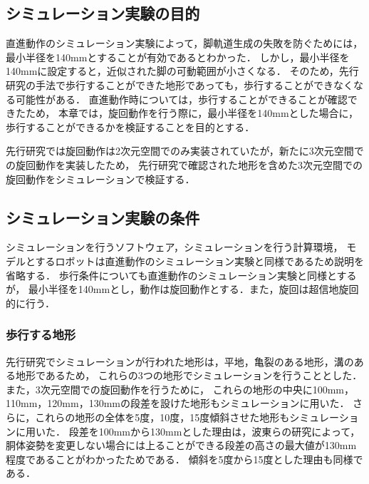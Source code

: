 
\subsection{シミュレーション実験の目的}
直進動作のシミュレーション実験によって，脚軌道生成の失敗を防ぐためには，最小半径を140mmとすることが有効であるとわかった．
しかし，最小半径を140mmに設定すると，近似された脚の可動範囲が小さくなる．
そのため，先行研究の手法で歩行することができた地形であっても，歩行することができなくなる可能性がある．
直進動作時については，歩行することができることが確認できたため，
本章では，旋回動作を行う際に，最小半径を140mmとした場合に，歩行することができるかを検証することを目的とする．

先行研究では旋回動作は2次元空間でのみ実装されていたが，新たに3次元空間での旋回動作を実装したため，
先行研究で確認された地形を含めた3次元空間での旋回動作をシミュレーションで検証する．

\subsection{シミュレーション実験の条件}
シミュレーションを行うソフトウェア，シミュレーションを行う計算環境，
モデルとするロボットは直進動作のシミュレーション実験と同様であるため説明を省略する．
歩行条件についても直進動作のシミュレーション実験と同様とするが，
最小半径を140mmとし，動作は旋回動作とする．また，旋回は超信地旋回的に行う．

\subsubsection{歩行する地形}
先行研究でシミュレーションが行われた地形は，平地，亀裂のある地形，溝のある地形であるため，
これらの3つの地形でシミュレーションを行うこととした．
また，3次元空間での旋回動作を行うために，
これらの地形の中央に100mm，110mm，120mm，130mmの段差を設けた地形もシミュレーションに用いた．
さらに，これらの地形の全体を5度，10度，15度傾斜させた地形もシミュレーションに用いた．
段差を100mmから130mmとした理由は，波東らの研究によって，胴体姿勢を変更しない場合には上ることができる段差の高さの最大値が130mm程度であることがわかったためである．
傾斜を5度から15度とした理由も同様である．

\newpage

